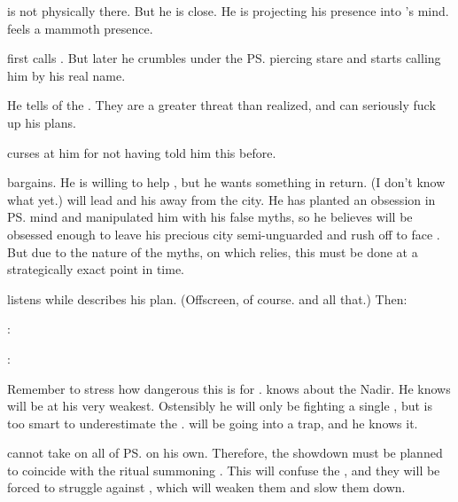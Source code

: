 \Ishnaruchaefir is not physically there. 
But he is close.
He is projecting his presence into \Psyrex's mind. 
\Psyrex feels a mammoth presence.

\Psyrex first calls \Ishnaruchaefir {}. 
But later he crumbles under the \ps{\dragonlord} piercing stare and starts calling him by his real name. 

He tells \Psyrex{} of the . 
They are a greater threat than \Psyrex{} realized, and can seriously fuck up his plans. 

\Psyrex{} curses at him for not having told him this before.

\Ishnaruchaefir{} bargains. 
He is willing to help \Psyrex, but he wants something in return. 
(I don't know what yet.) 
\Ishnaruchaefir{} will lead \Teshrial{} and his \noggyaleth{} away from the city. 
He has planted an obsession in \ps{\Teshrial} mind and manipulated him with his false myths, so he believes \Teshrial{} will be obsessed enough to leave his precious city semi-unguarded and rush off to face \Ishnaruchaefir. 
But due to the nature of the myths, on which \Teshrial{} relies, this must be done at a strategically exact point in time. 

\Psyrex{} listens while \Ishnaruchaefir{} describes his plan. 
(Offscreen, of course. 
  and all that.)
Then:
\begin{prose}
  \Psyrex:  
  
  \Ishnaruchaefir: 
\end{prose}

Remember to stress how dangerous this is for \Ishnaruchaefir.
\Psyrex knows about the Nadir. 
He knows \Ishnaruchaefir will be at his very weakest. 
Ostensibly he will only be fighting a single \resphan, but \Psyrex is too smart to underestimate the \resphain.
\Ishnaruchaefir will be going into a trap, and he knows it. 

\Ishnaruchaefir{} cannot take on all of \ps{\Teshrial} \noggyaleth{} on his own. 
Therefore, the showdown must be planned to coincide with the ritual summoning \Nithdornazsh. 
This will confuse the \noggyaleth, and they will be forced to struggle against \Nithdornazsh, which will weaken them and slow them down. 

